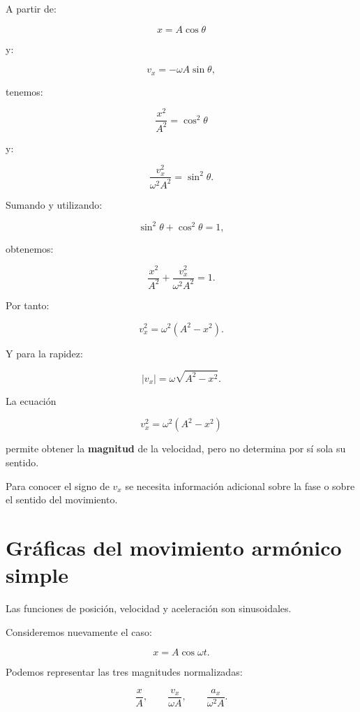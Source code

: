 A partir de:

\[ x=A\cos\theta \]

y:

\[ v_x=-\omega A\sin\theta, \]

tenemos:

\[ \frac{x^2}{A^2}=\cos^2\theta \]

y:

\[ \frac{v_x^2}{\omega^2A^2}=\sin^2\theta. \]

Sumando y utilizando:

\[ \sin^2\theta+\cos^2\theta=1, \]

obtenemos:

\[ \frac{x^2}{A^2}+\frac{v_x^2}{\omega^2A^2}=1. \]

Por tanto:

\[ \boxed{v_x^2=\omega^2(A^2-x^2)}. \]

Y para la rapidez:

\[ \boxed{|v_x|=\omega\sqrt{A^2-x^2}}. \]

\begin{advertencia}
La ecuación

\[ v_x^2=\omega^2(A^2-x^2) \]

permite obtener la \textbf{magnitud} de la velocidad, pero no determina por sí sola su sentido.

Para conocer el signo de \(v_x\) se necesita información adicional sobre la fase o sobre el sentido del movimiento.
\end{advertencia}

\section{Gráficas del movimiento armónico simple}

Las funciones de posición, velocidad y aceleración son sinusoidales.

Consideremos nuevamente el caso:

\[ x=A\cos\omega t. \]

Podemos representar las tres magnitudes normalizadas:

\[
\frac{x}{A},
\qquad
\frac{v_x}{\omega A},
\qquad
\frac{a_x}{\omega^2A}.
\]

